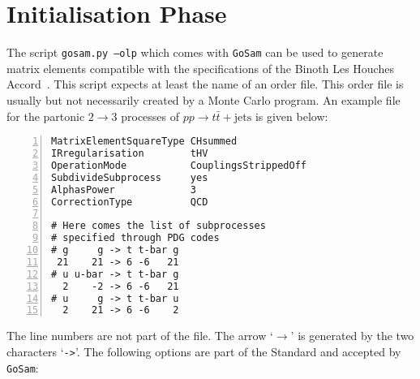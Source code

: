 \documentclass[11pt,a4paper]{refrep}
\newcommand{\golemversion}{{1{.}0}}
\newcommand{\golemv}[1][\golemversion]{{\tt GoSam}\xspace}
\begin{document}
\section{Initialisation Phase}
The script \texttt{gosam.py --olp} which comes with \golemv{} can be used to generate
matrix elements compatible with the specifications of the Binoth Les Houches
Accord~\cite{Binoth:2010xt}. This script expects at least the name of an order file.
This order file is usually but not necessarily created by a Monte Carlo program. An
example file for the partonic $2\to3$ processes of $pp\rightarrow t\bar{t}+\text{jets}$
is given below:
\begin{lstlisting}[language=olp,numbers=left]
MatrixElementSquareType CHsummed
IRregularisation        tHV
OperationMode           CouplingsStrippedOff
SubdivideSubprocess     yes
AlphasPower             3
CorrectionType          QCD

# Here comes the list of subprocesses
# specified through PDG codes
# g     g -> t t-bar g
 21    21 -> 6 -6   21
# u u-bar -> t t-bar g
  2    -2 -> 6 -6   21
# u     g -> t t-bar u
  2    21 -> 6 -6    2
\end{lstlisting}
The line numbers are not part of the file.
The arrow `$\rightarrow$' is generated by the two characters `\verb|->|'.
The following options are part of the Standard and accepted by
\golemv{}:
\lstset{language=olp}
\end{document}
